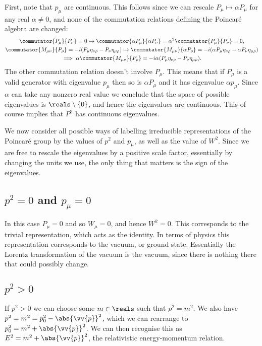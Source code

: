 \documentclass[fleqn]{NotesClass}
\newcommand{\minkowskiMetric}{\eta}
\begin{document}
    First, note that \(p_\mu\) are continuous.
    This follows since we can rescale \(P_\mu \mapsto \alpha P_\mu\) for any real \(\alpha \ne 0\), and none of the commutation relations defining the Poincar\'e algebra are changed:
    \begin{gather}
        \commutator{P_\mu}{P_\nu} = 0 \mapsto \commutator{\alpha P_\mu}{\alpha P_\nu} = \alpha^2\commutator{P_\mu}{P_\nu} = 0,\\
        \commutator{M_{\mu\nu}}{P_\rho} = -i(P_\mu \minkowskiMetric_{\nu\rho} - P_{\nu}\minkowskiMetric_{\mu\rho}) \mapsto \commutator{M_{\mu\nu}}{\alpha P_\rho} = -i(\alpha P_\mu \minkowskiMetric_{\nu\rho} - \alpha P_{\nu}\minkowskiMetric_{\mu\rho}) \notag\\
        \implies \alpha \commutator{M_{\mu\nu}}{P_\rho} = -i\alpha(P_\mu \minkowskiMetric_{\nu\rho} - P_{\nu}\minkowskiMetric_{\mu\rho}).
    \end{gather}
    The other commutation relation doesn't involve \(P_\mu\).
    This means that if \(P_\mu\) is a valid generator with eigenvalue \(p_\mu\) then so is \(\alpha P_\mu\) and it has eigenvalue \(\alpha p_\mu\).
    Since \(\alpha\) can take any nonzero real value we conclude that the space of possible eigenvalues is \(\reals\setminus\{0\}\), and hence the eigenvalues are continuous.
    This of course implies that \(P^2\) has continuous eigenvalues.
    
    We now consider all possible ways of labelling irreducible representations of the Poincar\'e group by the values of \(p^2\) and \(p_\mu\), as well as the value of \(W^2\).
    Since we are free to rescale the eigenvalues by a positive scale factor, essentially by changing the units we use, the only thing that matters is the sign of the eigenvalues.
    
    \subsection{\texorpdfstring{\(p^2 = 0\) and \(p_\mu = 0\)}{p squared and p mu Zero}}
    In this case \(P_\mu = 0\) and so \(W_\mu = 0\), and hence \(W^2 = 0\).
    This corresponds to the trivial representation, which acts as the identity.
    In terms of physics this representation corresponds to the vacuum, or ground state.
    Essentially the Lorentz transformation of the vacuum is the vacuum, since there is nothing there that could possibly change.
    
    \subsection{\texorpdfstring{\(p^2 > 0\)}{p squared Positive}}
    If \(p^2 > 0\) we can choose some \(m \in \reals\) such that \(p^2 = m^2\).
    We also have \(p^2 = m^2 = p_0^2 - \abs{\vv{p}}^2\), which we can rearrange to \(p_0^2 = m^2 + \abs{\vv{p}}^2\).
    We can then recognise this as \(E^2 = m^2 + \abs{\vv{p}}^2\), the relativistic energy-momentum relation.
    
\end{document}
